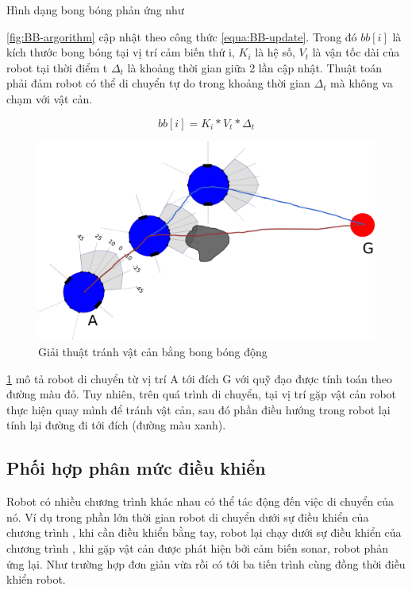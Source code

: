 Hình dạng bong bóng phản ứng như \figurename{ \ref{fig:BB-argorithm} cập nhật theo công thức \ref{equa:BB-update}. Trong đó $bb[i]$ là kích thước bong bóng tại vị trí cảm biến thứ i, $K_i$ là hệ số, $V_t$ là vận tốc dài của robot tại thời điểm t $\Delta_t$ là khoảng thời gian giữa 2 lần cập nhật.
Thuật toán phải đảm robot có thể di chuyển tự do trong khoảng thời gian $\Delta_t$ mà không va chạm với vật cản.

\begin{equation}
    bb[i] = K_i*V_t*\Delta_t
    \label{equa:BB-update}
\end{equation}

\begin{figure}[htbp]
    \centering
    \includegraphics[width=\linewidth]{figures/IR_BB-avoidance.png}
    \caption{Giải thuật tránh vật cản bằng bong bóng động}
    \label{fig:BB-avoidance}
\end{figure}

\figurename{ \ref{fig:BB-avoidance}} mô tả robot di chuyển từ vị trí A tới đích G với quỹ đạo được tính toán theo đường màu đỏ. Tuy nhiên, trên quá trình di chuyển, tại vị trí gặp vật cản robot thực hiện quay mình để tránh vật cản, sau đó phần điều hướng trong robot lại tính lại đường đi tới đích (đường màu xanh).

\subsection{Phối hợp phân mức điều khiển}
Robot có nhiều chương trình khác nhau có thể tác động đến việc di chuyển của nó. Ví dụ trong phần lớn thời gian robot di chuyển dưới sự điều khiển của chương trình , khi cần điều khiển bằng tay, robot lại chạy dưới sự điều khiển của chương trình , khi gặp vật cản được phát hiện bởi cảm biến sonar, robot phản ứng lại. Như trường hợp đơn giản vừa rồi có tới ba tiến trình cùng đồng thời điều khiển robot.

}
